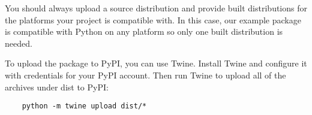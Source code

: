 You should always upload a source distribution and provide built distributions for the platforms your project is compatible with. In this case, our example package is compatible with Python on any platform so only one built distribution is needed.

To upload the package to PyPI, you can use Twine. Install Twine and configure it with credentials for your PyPI account. Then run Twine to upload all of the archives under dist to PyPI:

\begin{lstlisting}
    python -m twine upload dist/*
\end{lstlisting}

